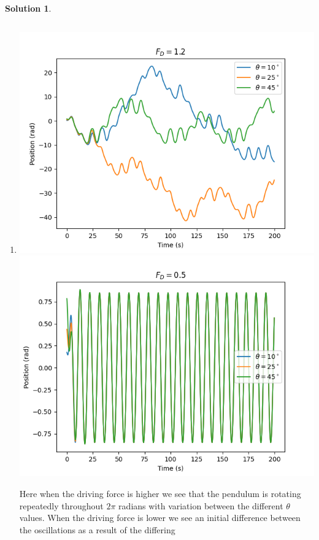 \documentclass[10pt]{article}
\theoremstyle{definition}
\newtheorem{soln}{Solution}
\begin{document}
\begin{soln}~
      \begin{enumerate}[label=(\alph*)]
            \item \inputminted[breaklines, autogobble]{python3}{./python/q2/q2a.py}
                  \begin{center}
                        \includegraphics[scale=0.75]{Figure_5-1.png}
                        \includegraphics[scale=0.75]{Figure_5-2.png}
                  \end{center}
                  Here when the driving force is higher we see that the pendulum is rotating repeatedly throughout $2\pi$ radians with variation between
                  the different $\theta$ values. When the driving force is lower we see an initial difference between the oscillations as a result of the differing

\end{enumerate}
\end{soln}
\end{document}
